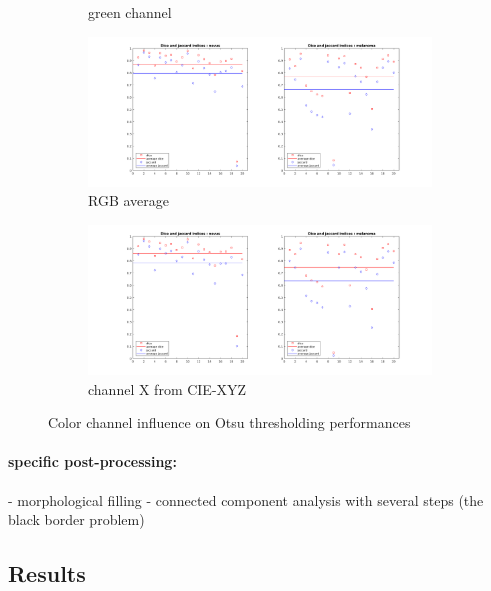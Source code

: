 \documentclass[a4paper,10pt]{article}
\begin{document}
\begin{figure}
\begin{subfigure}{0.7\textwidth}
		\caption{green channel}
		\label{fig:otsu-green}
	\end{subfigure}
	\begin{subfigure}{0.7\textwidth}
		\includegraphics[width=0.9\linewidth]{../results/color-channel-influence/base-evaluation/otsu-dice-jaccard-meanRGB.png}
		\caption{RGB average}
		\label{fig:otsu-mean}
	\end{subfigure}
	\begin{subfigure}{0.7\textwidth}
		\includegraphics[width=0.9\linewidth]{../results/color-channel-influence/base-evaluation/otsu-dice-jaccard-X.png}
		\caption{channel X from CIE-XYZ}
		\label{fig:otsu-X}
	\end{subfigure}
	
	\caption{Color channel influence on Otsu thresholding performances}
	\label{fig:color-channel-otsu}
\end{figure} 


\paragraph{specific post-processing:}
- morphological filling
- connected component analysis with several steps (the black border problem)

\subsection{Results}
\end{document}
